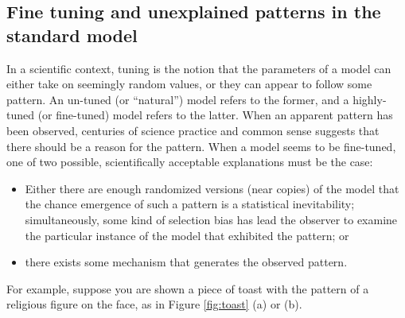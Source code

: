 \subsection{Fine tuning and unexplained patterns in the standard model}
\label{sec:finetune}
In a scientific context, tuning is the notion that the parameters of a model can either take on seemingly random values, or they can appear to follow some pattern. An un-tuned (or ``natural'') model refers to the former, and a highly-tuned (or fine-tuned) model refers to the latter. When an apparent pattern has been observed, centuries of science practice and common sense suggests that there should be a reason for the pattern. When a model seems to be fine-tuned, one of two possible, scientifically acceptable explanations must be the case:  
\begin{itemize}
\item{Either there are enough randomized versions (near copies) of the model that the chance emergence of such a pattern is a statistical inevitability; simultaneously, some kind of selection bias has lead the observer to examine the particular instance of the model that exhibited the pattern; or}
\item{there exists some mechanism that generates the observed pattern. }
\end{itemize}
For example, suppose you are shown a piece of toast with the pattern of a religious figure on the face, as in Figure \ref{fig:toast} (a) or (b). 
